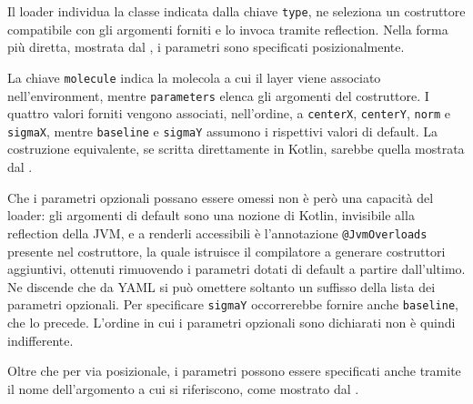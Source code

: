 

Il loader individua la classe indicata dalla chiave \texttt{type}, ne seleziona un
costruttore compatibile con gli argomenti forniti e lo invoca tramite reflection. Nella
forma più diretta, mostrata dal , i parametri sono specificati posizionalmente.



La chiave \texttt{molecule} indica la molecola a cui il layer viene associato
nell'environment, mentre \texttt{parameters} elenca gli argomenti del costruttore. I
quattro valori forniti vengono associati, nell'ordine, a \texttt{centerX},
\texttt{centerY}, \texttt{norm} e \texttt{sigmaX}, mentre \texttt{baseline} e
\texttt{sigmaY} assumono i rispettivi valori di default. La costruzione equivalente, se
scritta direttamente in Kotlin, sarebbe quella mostrata dal .



Che i parametri opzionali possano essere omessi non è però una capacità del loader: gli
argomenti di default sono una nozione di Kotlin, invisibile alla reflection della \ac{JVM}, e a
renderli accessibili è l'annotazione \texttt{@JvmOverloads} presente nel
costruttore, la quale istruisce il compilatore a generare costruttori aggiuntivi, ottenuti
rimuovendo i parametri dotati di default a partire dall'ultimo. Ne
discende che da YAML si può omettere soltanto un
suffisso della lista dei parametri opzionali. Per specificare \texttt{sigmaY} occorrerebbe
fornire anche \texttt{baseline}, che lo precede.
L'ordine in cui i parametri opzionali sono dichiarati non è quindi indifferente.

Oltre che per via posizionale, i parametri possono essere specificati anche tramite il
nome dell'argomento a cui si riferiscono, come mostrato dal .



